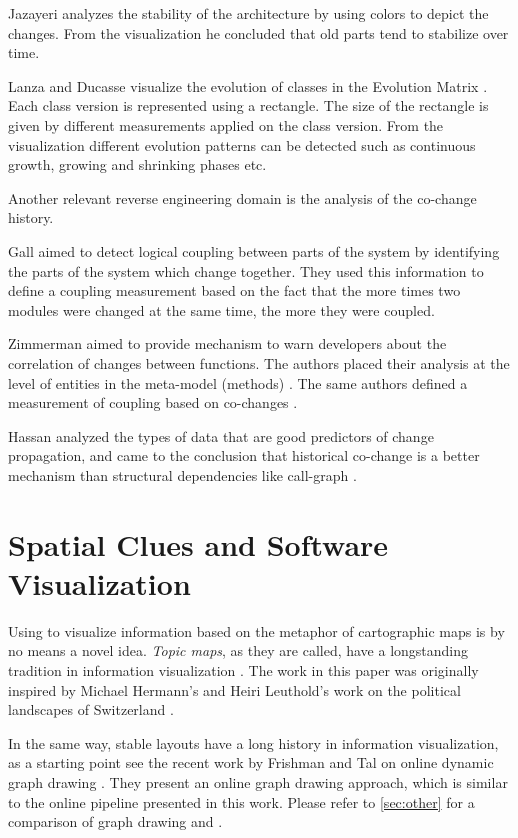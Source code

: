Jazayeri analyzes the stability of the architecture \cite{Jaza02a} by using colors to depict the changes. From the visualization he concluded that old parts tend to stabilize over time.

Lanza and Ducasse visualize the evolution of classes in the Evolution Matrix \cite{Lanz02a}. Each class version is represented using a rectangle. The size of the rectangle is given by different measurements applied on the class version. From the visualization different evolution patterns can be detected such as continuous growth, growing and shrinking phases etc.

Another relevant reverse engineering domain is the analysis of the co-change history.

Gall \etal aimed to detect logical coupling between parts of the system \cite{Gall98a} by identifying the parts of the system which change together. They used this information to define a coupling measurement based on the fact that the more times two modules were changed at the same time, the more they were coupled.

Zimmerman \etal aimed to provide mechanism to warn developers about the correlation of changes between functions. The authors placed their analysis at the level of entities in the meta-model (\eg methods) \cite{Zimm04a}. The same authors defined a measurement of coupling based on co-changes \cite{Zimm03a}.

Hassan \etal analyzed the  types of data that are good predictors of change propagation, and came to the conclusion that historical co-change is a better mechanism than structural dependencies like call-graph \cite{Hass04a}.

\section{Spatial Clues and Software Visualization}

Using \mds to visualize information based on the metaphor of cartographic maps is by no means a novel idea. \emph{Topic maps}, as they are called, have a longstanding tradition in information visualization \cite{Ware04a}. The work in this paper was originally inspired by Michael Hermann's and Heiri Leuthold's work on the political landscapes of Switzerland \cite{Herm03a}. 

In the same way, stable layouts have a long history in information visualization, as a starting point see \eg the recent work by Frishman and Tal on online dynamic graph drawing \cite{Fris08a}. They present an online graph drawing approach, which is similar to the online pipeline presented in this work. Please refer to \autoref{sec:other} for a comparison of graph drawing and \MDS. 

